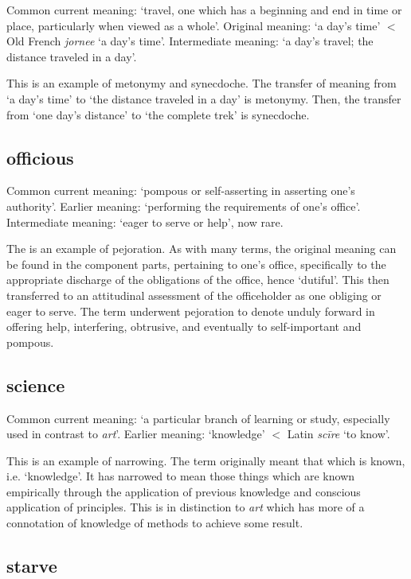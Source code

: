 \documentclass[12pt]{article}
\begin{document}
Common current meaning: `travel, one which has a beginning and end in time or place, particularly when viewed as a whole'. Original meaning: `a day's time' $<$ Old French {\it jornee} `a day's time'. Intermediate meaning: `a day's travel; the distance traveled in a day'.

This is an example of metonymy and synecdoche. The transfer of meaning from `a day's time' to `the distance traveled in a day' is metonymy. Then, the transfer from `one day's distance' to `the complete trek' is synecdoche.

\subsection{officious}

Common current meaning: `pompous or self-asserting in asserting one's authority'. Earlier meaning: `performing the requirements of one's office'. Intermediate meaning: `eager to serve or help', now rare.

The is an example of pejoration. As with many terms, the original meaning can be found in the component parts, pertaining to one's office, specifically to the appropriate discharge of the obligations of the office, hence `dutiful'. This then transferred to an attitudinal assessment of the officeholder as one obliging or eager to serve. The term underwent pejoration to denote unduly forward in offering help, interfering, obtrusive, and eventually to self-important and pompous.

\subsection{science}

Common current meaning: `a particular branch of learning or study, especially used in contrast to {\it art}'. Earlier meaning: `knowledge' $<$ Latin {\it sc\=ire} `to know'.

This is an example of narrowing. The term originally meant that which is known, i.e. `knowledge'. It has narrowed to mean those things which are known empirically through the application of previous knowledge and conscious application of principles. This is in distinction to {\it art} which has more of a connotation of knowledge of methods to achieve some result.

\subsection{starve}
\end{document}
